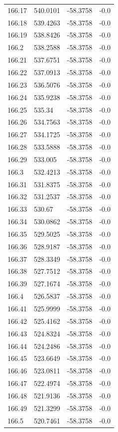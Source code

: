 \begin{table}[H]
\begin{tabular}{llll}
166.17 & 540.0101 & -58.3758 & -0.0 \\
166.18 & 539.4263 & -58.3758 & -0.0 \\
166.19 & 538.8426 & -58.3758 & -0.0 \\
166.2 & 538.2588 & -58.3758 & -0.0 \\
166.21 & 537.6751 & -58.3758 & -0.0 \\
166.22 & 537.0913 & -58.3758 & -0.0 \\
166.23 & 536.5076 & -58.3758 & -0.0 \\
166.24 & 535.9238 & -58.3758 & -0.0 \\
166.25 & 535.34 & -58.3758 & -0.0 \\
166.26 & 534.7563 & -58.3758 & -0.0 \\
166.27 & 534.1725 & -58.3758 & -0.0 \\
166.28 & 533.5888 & -58.3758 & -0.0 \\
166.29 & 533.005 & -58.3758 & -0.0 \\
166.3 & 532.4213 & -58.3758 & -0.0 \\
166.31 & 531.8375 & -58.3758 & -0.0 \\
166.32 & 531.2537 & -58.3758 & -0.0 \\
166.33 & 530.67 & -58.3758 & -0.0 \\
166.34 & 530.0862 & -58.3758 & -0.0 \\
166.35 & 529.5025 & -58.3758 & -0.0 \\
166.36 & 528.9187 & -58.3758 & -0.0 \\
166.37 & 528.3349 & -58.3758 & -0.0 \\
166.38 & 527.7512 & -58.3758 & -0.0 \\
166.39 & 527.1674 & -58.3758 & -0.0 \\
166.4 & 526.5837 & -58.3758 & -0.0 \\
166.41 & 525.9999 & -58.3758 & -0.0 \\
166.42 & 525.4162 & -58.3758 & -0.0 \\
166.43 & 524.8324 & -58.3758 & -0.0 \\
166.44 & 524.2486 & -58.3758 & -0.0 \\
166.45 & 523.6649 & -58.3758 & -0.0 \\
166.46 & 523.0811 & -58.3758 & -0.0 \\
166.47 & 522.4974 & -58.3758 & -0.0 \\
166.48 & 521.9136 & -58.3758 & -0.0 \\
166.49 & 521.3299 & -58.3758 & -0.0 \\
166.5 & 520.7461 & -58.3758 & -0.0 \\

\end{tabular}
\end{table}
